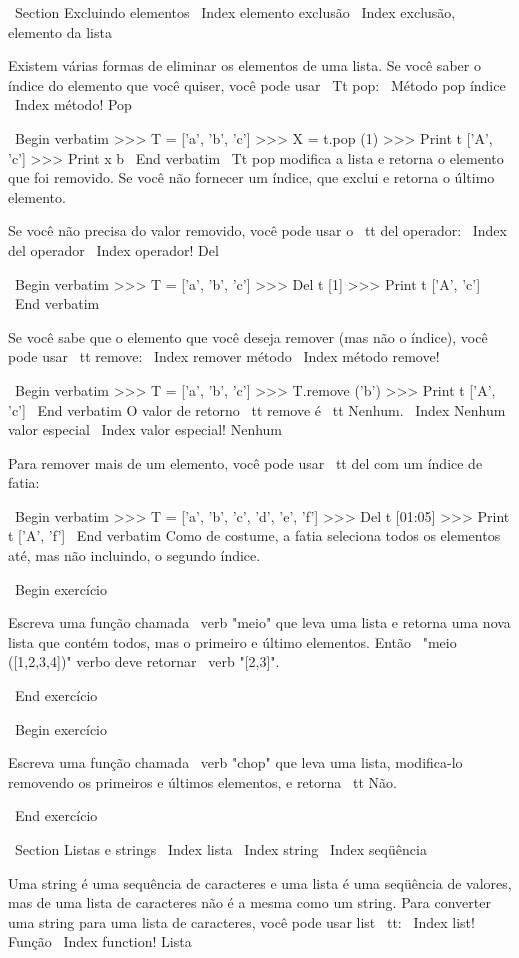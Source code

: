 \documentclass[10pt]{book}
\begin{document}
{{{{{{\ Section {Excluindo elementos}
\ Index {elemento exclusão}
\ Index {exclusão, elemento da lista}

Existem várias formas de eliminar os elementos de uma lista. Se você
saber o índice do elemento que você quiser, você pode usar
{\ Tt pop}:
\ {Método pop} índice
\ Index {método! Pop}

\ Begin {verbatim}
>>> T = ['a', 'b', 'c']
>>> X = t.pop (1)
>>> Print t
['A', 'c']
>>> Print x
b
\ End {verbatim}
%
{\ Tt pop} modifica a lista e retorna o elemento que foi removido.
Se você não fornecer um índice, que exclui e retorna o
último elemento.

Se você não precisa do valor removido, você pode usar o {\ tt del}
operador:
\ Index {del operador}
\ Index {operador! Del}

\ Begin {verbatim}
>>> T = ['a', 'b', 'c']
>>> Del t [1]
>>> Print t
['A', 'c']
\ End {verbatim}
%

Se você sabe que o elemento que você deseja remover (mas não o índice), você
pode usar {\ tt remove}:
\ Index {remover método}
\ Index {método remove!}

\ Begin {verbatim}
>>> T = ['a', 'b', 'c']
>>> T.remove ('b')
>>> Print t
['A', 'c']
\ End {verbatim}
%
O valor de retorno {\ tt remove} é {\ tt Nenhum}.
\ Index {Nenhum valor especial}
\ Index {valor especial! Nenhum}

Para remover mais de um elemento, você pode usar {\ tt del} com
um índice de fatia:

\ Begin {verbatim}
>>> T = ['a', 'b', 'c', 'd', 'e', ​​'f']
>>> Del t [01:05]
>>> Print t
['A', 'f']
\ End {verbatim}
%
Como de costume, a fatia seleciona todos os elementos até, mas não
incluindo, o segundo índice.

\ Begin {} exercício

Escreva uma função chamada \ verb "meio" que leva uma lista e
retorna uma nova lista que contém todos, mas o primeiro e último
elementos. Então \ "meio ([1,2,3,4])" verbo deve retornar \ verb "[2,3]".

\ End {} exercício

\ Begin {} exercício

Escreva uma função chamada \ verb "chop" que leva uma lista, modifica-lo
removendo os primeiros e últimos elementos, e retorna {\ tt Não}.

\ End {} exercício


\ Section {Listas e strings}
\ Index {lista}
\ Index {string}
\ Index {seqüência}

Uma string é uma sequência de caracteres e uma lista é uma seqüência
de valores, mas de uma lista de caracteres não é a mesma como um
string. Para converter uma string para uma lista de caracteres,
você pode usar {list \ tt}:
\ Index {list! Função}
\ Index {function! Lista}

}}}}}}
\end{document}
